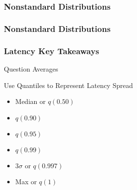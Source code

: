 \begin{frame}
    \frametitle{Nonstandard Distributions}
    \begin{figure}[!h]
        \centering
        
    \end{figure}
\end{frame}
\begin{frame}
    \frametitle{Nonstandard Distributions}
    \begin{figure}[!h]
        \centering
        
    \end{figure}
\end{frame}


\begin{frame}
    \frametitle{Latency Key Takeaways}

    Question Averages
    
    Use Quantiles to Represent Latency Spread
    \begin{itemize}
        \item Median or $q(0.50)$
        \item $q(0.90)$
        \item $q(0.95)$
        \item $q(0.99)$
        \item $3\sigma$ or $q(0.997)$
        \item Max or $q(1)$
    \end{itemize}
\end{frame}


